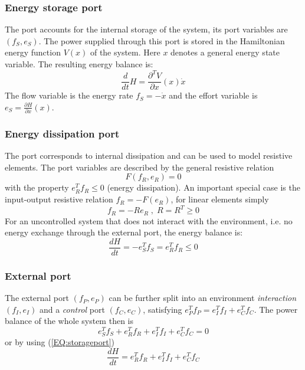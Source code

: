 \documentclass[a4paper,twoside, openright,12pt]{report}
\begin{document}
\subsubsection{Energy storage port}
The port accounts for the internal storage of the system, its port variables are $ (f_S,e_S) $. The power supplied through this port is stored in the Hamiltonian energy function $V(x)$ of the system. Here $x$ denotes a general energy state variable. The resulting energy balance is:
\begin{equation}\label{EQ:storageport}
	\frac{d}{dt}H = \frac{\partial^T V}{\partial x}(x) \dot{x}
\end{equation}
The flow variable is the energy rate $ f_S = -\dot{x} $ and the effort variable is $ e_S = \frac{\partial H}{\partial x}(x) $.

\subsubsection{Energy dissipation port}
The port corresponds to internal dissipation and can be used to model resistive elements. The port variables are described by the general resistive relation
\begin{equation}
	F(f_R,e_R)=0
\end{equation}
with the property  $ e_R^T  f_R \leq 0 $ (energy dissipation). An important special case is the input-output resistive relation $f_R = -F(e_R)$, for linear elements simply
\begin{equation}
f_R = -Re_R \; , \; R=R^T\geq0
\end{equation}
For an uncontrolled system that does not interact with the environment, i.e. no energy exchange through the  external port, the energy balance is:
\begin{equation}
	\frac{dH}{dt} = -e_S^Tf_S = e_R^T f_R \leq 0
\end{equation}

\subsubsection{External port}
The external port $(f_P,e_P)$ can be further split into an environment \emph{interaction} $(f_I,e_I)$ and a \emph{control} port $(f_C,e_C)$, satisfying $e_P^Tf_P = e_I^Tf_I + e_C^Tf_C$.
The power balance of the whole system then is
\begin{equation}
	e_S^Tf_S + e_R^T f_R +e_I^Tf_I + e_C^T f_C = 0
\end{equation} 
or by using (\ref{EQ:storageport})
\begin{equation}\label{EQ:energybalance}
	\frac{dH}{dt} = e_R^T f_R +e_I^Tf_I + e_C^T f_C 
\end{equation}
\end{document}
